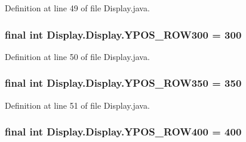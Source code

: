 Definition at line 49 of file Display.\+java.

\hypertarget{class_display_1_1_display_aaf16f1b813645dc5969d6547d7947b3a}{}
\subsubsection[{Y\+P\+O\+S\+\_\+\+R\+O\+W300}]{\setlength{\rightskip}{0pt plus 5cm}final int Display.\+Display.\+Y\+P\+O\+S\+\_\+\+R\+O\+W300 = 300\hspace{0.3cm}{\ttfamily [static]}}\label{class_display_1_1_display_aaf16f1b813645dc5969d6547d7947b3a}


Definition at line 50 of file Display.\+java.

\hypertarget{class_display_1_1_display_ad479e849d0564e40118e7d76652d9ffa}{}
\subsubsection[{Y\+P\+O\+S\+\_\+\+R\+O\+W350}]{\setlength{\rightskip}{0pt plus 5cm}final int Display.\+Display.\+Y\+P\+O\+S\+\_\+\+R\+O\+W350 = 350\hspace{0.3cm}{\ttfamily [static]}}\label{class_display_1_1_display_ad479e849d0564e40118e7d76652d9ffa}


Definition at line 51 of file Display.\+java.

\hypertarget{class_display_1_1_display_a30efc4ca7cf960942741ac557862fbc8}{}
\subsubsection[{Y\+P\+O\+S\+\_\+\+R\+O\+W400}]{\setlength{\rightskip}{0pt plus 5cm}final int Display.\+Display.\+Y\+P\+O\+S\+\_\+\+R\+O\+W400 = 400\hspace{0.3cm}{\ttfamily [static]}}\label{class_display_1_1_display_a30efc4ca7cf960942741ac557862fbc8}


